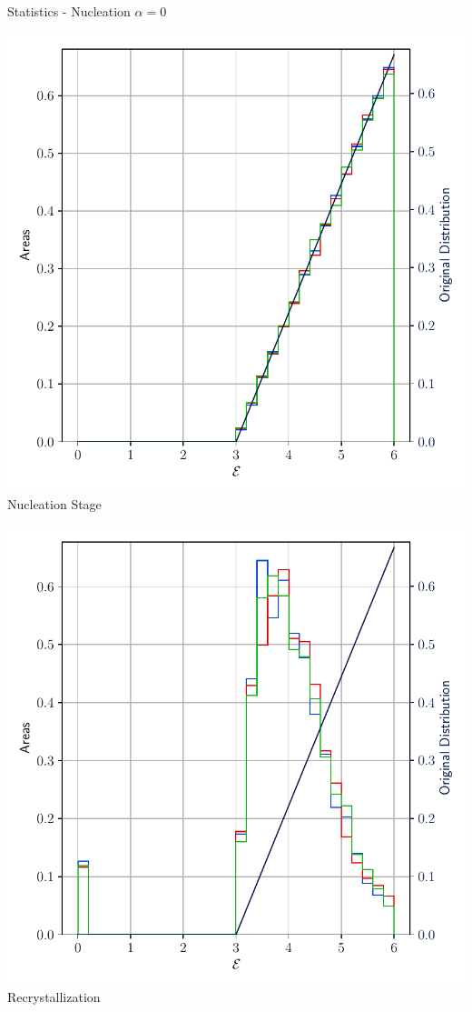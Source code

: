 \documentclass[usenames,dvipsnames]{beamer}
\begin{document}
\begin{frame}{Statistics - Nucleation $\alpha = 0$}
\small
    \begin{minipage}{0.5\textwidth}
    \centering
    \includegraphics[scale=0.35]{figures/stored_energy/SE/se/000000_nuclconstant_set.pdf}\\
    Nucleation Stage
    \end{minipage}%
    \begin{minipage}{0.5\textwidth}
    \centering
    \includegraphics[scale=0.35]{figures/stored_energy/SE/se/000070_nuclconstant_set.pdf}\\
    Recrystallization
    \end{minipage}
\end{frame}
\end{document}
